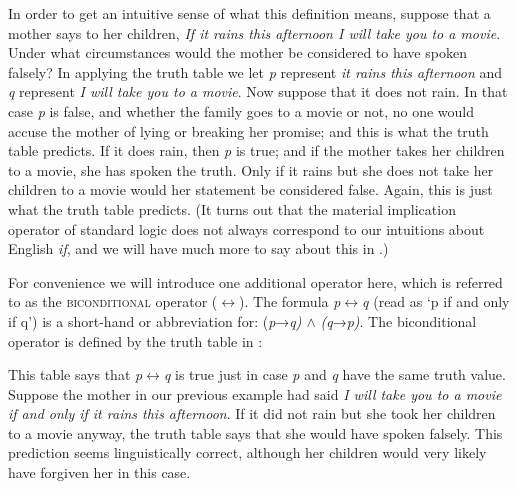 In order to get an intuitive sense of what this definition means, suppose that a mother says to her children, \textit{If it rains this afternoon I will take you to a movie}. Under what circumstances would the mother be considered to have spoken falsely? In applying the truth table we let \textit{p} represent \textit{it rains this afternoon} and \textit{q} represent \textit{I will take you to a movie}. Now suppose that it does not rain. In that case \textit{p} is false, and whether the family goes to a movie or not, no one would accuse the mother of lying or breaking her promise; and this is what the truth table predicts. If it does rain, then \textit{p} is true; and if the mother takes her children to a movie, she has spoken the truth. Only if it rains but she does not take her children to a movie would her statement be considered false. Again, this is just what the truth table predicts. (It turns out that the material implication operator of standard logic does not always correspond to our intuitions about English \textit{if}, and we will have much more to say about this in .)



For convenience we will introduce one additional operator here, which is referred to as the \textsc{biconditional} operator (\textit{$\leftrightarrow $}). The formula \textit{p$\leftrightarrow $}\textit{q} (read as ‘p if and only if q’) is a short-hand or abbreviation for: (\textit{p}→\textit{q) $\wedge$} \textit{(q}→\textit{p)}. The biconditional operator is defined by the truth table in :



This table says that \textit{p}$\leftrightarrow $\textit{q} is true just in case \textit{p} and \textit{q} have the same truth value. Suppose the mother in our previous example had said \textit{I will take you to a movie if and only if it rains this afternoon}. If it did not rain but she took her children to a movie anyway, the truth table says that she would have spoken falsely. This prediction seems linguistically correct, although her children would very likely have forgiven her in this case.



